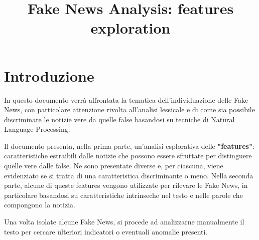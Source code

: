 \documentclass{article}
\title{Fake News Analysis: features exploration}
\begin{document}
	\maketitle   
	 
    \newpage
    	
   	\section{Introduzione}
    	In questo documento verrà affrontata la tematica dell'individuazione delle Fake News, con particolare attenzione rivolta all'analisi lessicale e di come sia possibile discriminare le notizie vere da quelle false basandosi su tecniche di Natural Language Processing.
	    	
	    Il documento presenta, nella prima parte, un'analisi esplorativa delle \textbf{"features"}: caratteristiche estraibili dalle notizie che possono essere sfruttate per distinguere quelle vere dalle false. Ne sono presentate diverse e, per ciascuna, viene evidenziato se si tratta di una caratteristica discriminante o meno.
	    Nella seconda parte, alcune di queste features vengono utilizzate per rilevare le Fake News, in particolare basandosi su caratteristiche intrinseche nel testo e nelle parole che compongono la notizia.
	    	
	    Una volta isolate alcune Fake News, si procede ad analizzarne manualmente il testo per cercare ulteriori indicatori o eventuali anomalie presenti.
	    
	    \newpage
	    
\end{document}
